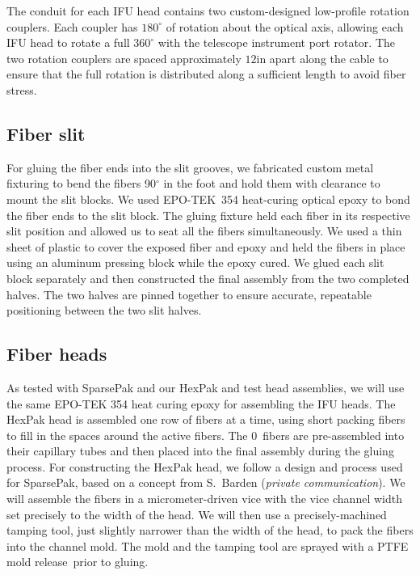 The conduit for each IFU head contains two custom-designed low-profile
rotation couplers.  Each coupler has $180^{\circ}$ of rotation about the
optical axis, allowing each IFU head to rotate a full $360^{\circ}$ with the
telescope instrument port rotator.  The two rotation couplers are spaced
approximately $12$in apart along the cable to ensure that the full rotation is
distributed along a sufficient length to avoid fiber stress.


\subsection{Fiber slit}
\label{GPBsub:sec:slitconstruct}
For gluing the fiber ends into the slit grooves, we fabricated custom metal
fixturing to bend the fibers 90$^{\circ}$ in the foot and hold them with
clearance to mount the slit blocks.  We used EPO-TEK\footnotemark\ 354
heat-curing optical epoxy to bond the fiber ends to the slit block.
 The gluing fixture held each fiber in its respective slit
position and allowed us to seat all the fibers simultaneously.  We used a thin
sheet of plastic to cover the exposed fiber and epoxy and held the fibers in
place using an aluminum pressing block while the epoxy cured.  We glued each
slit block separately and then constructed the final assembly from the two
completed halves.  The two halves are pinned together to ensure accurate,
repeatable positioning between the two slit halves.

\subsection{Fiber heads}
\label{subsec:headconstruct}
As tested with SparsePak and our HexPak and \GP test head assemblies, we
will use the same EPO-TEK 354 heat curing epoxy for assembling the IFU heads.
The HexPak head is assembled one row of fibers at a time, using short packing
fibers to fill in the spaces around the active fibers.  The 0\ fibers
are pre-assembled into their capillary tubes and then placed into the final
assembly during the gluing process.  For constructing the HexPak head, we
follow a design and process used for SparsePak, based on a concept from
S.\ Barden (\emph{private communication}).  We will assemble the fibers in a
micrometer-driven vice with the vice channel width set precisely to the width
of the head.  We will then use a precisely-machined tamping tool, just
slightly narrower than the width of the head, to pack the fibers into the
channel mold.  The mold and the tamping tool are sprayed with a PTFE mold
release\footnotemark[1]\ prior to gluing.  


